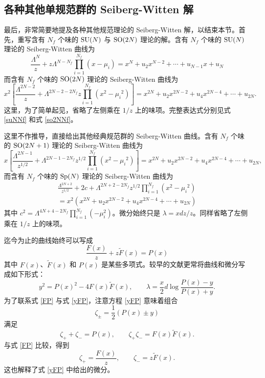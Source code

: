 \subsection{各种其他单规范群的 Seiberg-Witten 解}\label{sec:others}
最后，非常简要地提及各种其他规范理论的 Seiberg-Witten 解，以结束本节。首先，重写含有 $N_f$ 个味的 $\mathop{\mathrm{SU}}(N)$ 与 $\mathop{\mathrm{SO}}(2N)$ 理论的解。含有 $N_f$ 个味的 $\mathop{\mathrm{SU}}(N)$ 理论的 Seiberg-Witten 曲线为
\begin{equation}
\frac{\Lambda^N}z+z\Lambda^{N-N_f}\prod_{i=1}^{N_f}(x-\mu_i)
=x^N+u_2x^{N-2}+\cdots+u_{N-1}x+u_N
\end{equation}
而含有 $N_f$ 个味的 $\mathop{\mathrm{SO}}(2N)$ 理论的 Seiberg-Witten 曲线为
\begin{equation}
x^2\left[\frac{\Lambda^{2N-2}}z+\Lambda^{2N-2-2N_f}z\prod_{i=1}^{N_f}(x^2-\mu_i{}^2)\right]
=x^{2N}+u_2x^{2N-2}+u_4x^{2N-4}+\cdots+u_{2N}.
\end{equation}
这里，为了简单起见，省略了左侧乘在 $1/z$ 上的味项。完整表达式分别见式 \eqref{suNNf} 和式 \eqref{so2NNf}。

这里不作推导，直接给出其他经典规范群的 Seiberg-Witten 曲线。含有 $N_f$ 个味的 $\mathop{\mathrm{SO}}(2N+1)$ 理论的 Seiberg-Witten 曲线为
\begin{equation}
x\left[\frac{\Lambda^{2N-1}}{z^{1/2}}+\Lambda^{2N-1-2N_f}z^{1/2}\prod_{i=1}^{N_f}(x^2-\mu_i{}^2)\right]
=x^{2N}+u_2x^{2N-2}+u_4x^{2N-4}+\cdots+u_{2N},
\end{equation}
而含有 $N_f$ 个味的 $\mathop{\mathrm{Sp}}(N)$ 理论的 Seiberg-Witten 曲线为
\begin{multline}
\frac{\Lambda^{2N+2}}{z^{1/2}}+2c+\Lambda^{2N+2-2N_f}z^{1/2}\prod_{i=1}^{N_f}(x^2-\mu_i{}^2)\\
=x^2(x^{2N}+u_2x^{2N-2}+u_4x^{2N-4}+\cdots+u_{2N})
\end{multline}
其中 $c^2=\Lambda^{4N+4-2N_f}\prod_{i=1}^{N_f}(-\mu_i^2)$。微分始终只是 $\lambda=xdz/z$。同样省略了左侧乘在 $1/z$ 上的味项。

迄今为止的曲线始终可以写成
\begin{equation}
\frac{F(x)}z+z\tilde F(x)=P(x)\label{FP}
\end{equation}
其中 $F(x)$、$\tilde F(x)$ 和 $P(x)$ 是某些多项式。较早的文献更常将曲线和微分写成如下形式：
\begin{equation}
y^2=P(x)^2-4F(x)\tilde F(x),\qquad
\lambda=\frac x2d\log\frac{P(x)-y}{P(x)+y}.\label{yFP}
\end{equation}
为了联系式 \eqref{FP} 与式 \eqref{yFP}，注意方程 \eqref{yFP} 意味着组合
\begin{equation}
\zeta_\pm=\frac12(P(x)\pm y)
\end{equation}
满足
\begin{equation}
\zeta_++\zeta_-=P(x),\qquad\zeta_+\zeta_-=F(x)\tilde F(x).
\end{equation}
与式 \eqref{FP} 比较，得到
\begin{equation}
\zeta_+=\frac{F(x)}z,\qquad\zeta_-=z\tilde F(x).
\end{equation}
这也解释了式 \eqref{yFP} 中给出的微分。

